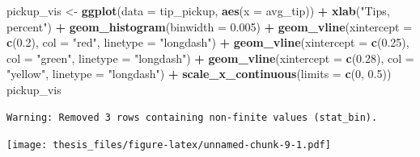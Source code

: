 \documentclass[12pt,twoside]{reedthesis}
\newenvironment{Shaded}{\begin{snugshade}}{\end{snugshade}}
\newcommand{\KeywordTok}[1]{\textcolor[rgb]{0.13,0.29,0.53}{\textbf{#1}}}
\newcommand{\DataTypeTok}[1]{\textcolor[rgb]{0.13,0.29,0.53}{#1}}
\newcommand{\DecValTok}[1]{\textcolor[rgb]{0.00,0.00,0.81}{#1}}
\newcommand{\FloatTok}[1]{\textcolor[rgb]{0.00,0.00,0.81}{#1}}
\newcommand{\StringTok}[1]{\textcolor[rgb]{0.31,0.60,0.02}{#1}}
\newcommand{\CommentTok}[1]{\textcolor[rgb]{0.56,0.35,0.01}{\textit{#1}}}
\newcommand{\OperatorTok}[1]{\textcolor[rgb]{0.81,0.36,0.00}{\textbf{#1}}}
\newcommand{\NormalTok}[1]{#1}
\theoremstyle{definition}
\theoremstyle{definition}
\theoremstyle{definition}
\theoremstyle{remark}
\begin{document}
\begin{Shaded}
\begin{Highlighting}[]
\NormalTok{pickup_vis <-}\StringTok{ }\KeywordTok{ggplot}\NormalTok{(}\DataTypeTok{data =}\NormalTok{ tip_pickup, }\KeywordTok{aes}\NormalTok{(}\DataTypeTok{x =}\NormalTok{ avg_tip)) }\OperatorTok{+}\StringTok{ }
\StringTok{    }\KeywordTok{xlab}\NormalTok{(}\StringTok{"Tips, percent"}\NormalTok{) }\OperatorTok{+}\StringTok{ }\KeywordTok{geom_histogram}\NormalTok{(}\DataTypeTok{binwidth =} \FloatTok{0.005}\NormalTok{) }\OperatorTok{+}\StringTok{ }
\StringTok{    }\KeywordTok{geom_vline}\NormalTok{(}\DataTypeTok{xintercept =} \KeywordTok{c}\NormalTok{(}\FloatTok{0.2}\NormalTok{), }\DataTypeTok{col =} \StringTok{"red"}\NormalTok{, }\DataTypeTok{linetype =} \StringTok{"longdash"}\NormalTok{) }\OperatorTok{+}\StringTok{ }
\StringTok{    }\KeywordTok{geom_vline}\NormalTok{(}\DataTypeTok{xintercept =} \KeywordTok{c}\NormalTok{(}\FloatTok{0.25}\NormalTok{), }\DataTypeTok{col =} \StringTok{"green"}\NormalTok{, }
        \DataTypeTok{linetype =} \StringTok{"longdash"}\NormalTok{) }\OperatorTok{+}\StringTok{ }\KeywordTok{geom_vline}\NormalTok{(}\DataTypeTok{xintercept =} \KeywordTok{c}\NormalTok{(}\FloatTok{0.28}\NormalTok{), }
    \DataTypeTok{col =} \StringTok{"yellow"}\NormalTok{, }\DataTypeTok{linetype =} \StringTok{"longdash"}\NormalTok{) }\OperatorTok{+}\StringTok{ }\KeywordTok{scale_x_continuous}\NormalTok{(}\DataTypeTok{limits =} \KeywordTok{c}\NormalTok{(}\DecValTok{0}\NormalTok{, }
    \FloatTok{0.5}\NormalTok{))}
\NormalTok{pickup_vis}
\end{Highlighting}
\end{Shaded}
\begin{verbatim}
Warning: Removed 3 rows containing non-finite values (stat_bin).
\end{verbatim}
\texttt{[image: thesis\_files/figure-latex/unnamed-chunk-9-1.pdf]}
\begin{Shaded}
\end{Shaded}
\end{document}
